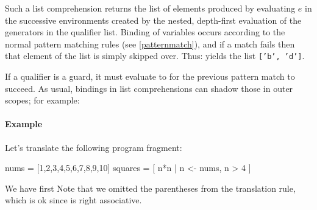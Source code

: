 Such a list comprehension returns the list of elements produced by evaluating $e$ in the successive environments created by the nested, depth-first evaluation of the generators in the qualifier list.
Binding of variables occurs according to the normal pattern matching rules (see \autoref{patternmatch}), and if a match fails then that element of the list is simply skipped over.
Thus:
\example{ [ x $|$ (2, x) $\leftarrow{}$ [(1, 'a'), (2, 'b'), (3, 'c'), (2, 'd')] ]}
yields the list \texttt{['b', 'd']}.

If a qualifier is a guard, it must evaluate to  for the previous pattern match to succeed.
As usual, bindings in list comprehensions can shadow those in outer scopes; for example:


\paragraph{Example}
Let's translate the following program fragment:
\begin{code}
nums = [1,2,3,4,5,6,7,8,9,10]
squares = [ n*n | n <- nums, n > 4 ]
\end{code}
We have first 
Note that we omitted the parentheses from the translation rule, which is ok since \sym{:} is right associative.

